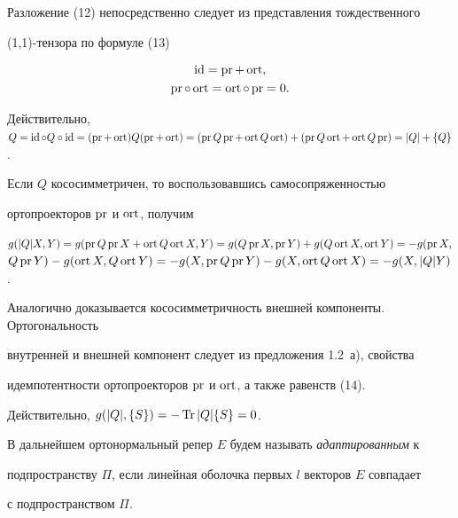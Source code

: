 \begin{pf}


Разложение (12) непосредственно следует из представления тождественного


(1,1)-тензора по формуле (13)


\begin{gather}


\id =\pr +\ort,\\


\pr \circ \ort =\ort \circ \pr =0.


\end{gather}


Действительно, $Q=\id \circ Q\circ \id =(\pr +\ort )Q(\pr +\ort )=


(\pr Q\pr +\ort Q\ort )+(\pr Q\ort +\ort Q\pr )=|Q|+\{ Q\}$.


Если $Q$ кососимметричен, то воспользовавшись самосопряженностью


ортопроекторов $\operatorname{pr} $ и $\operatorname{ort} $, получим


$g(|Q|X,Y)=g(\pr Q\pr X+\ort Q\ort X,Y)=g(Q\pr X,\pr Y)+g(Q\ort X,\ort Y)=


-g(\pr X,$ $Q\pr Y)-g(\ort X,Q\ort Y)=-g(X,\pr Q\pr Y)-g(X,\ort Q\ort X)=


-g(X,|Q|Y)$.


Аналогично доказывается кососимметричность внешней компоненты. Ортогональность


внутренней и внешней компонент следует из предложения 1.2~а), свойства


идемпотентности ортопроекторов $\operatorname{pr} $ и $\operatorname{ort} $, а также равенств (14).


Действительно, $g(|Q|,\{ S\} )=-\operatorname{Tr}|Q|\{ S\}=0$.


\end{pf}





В дальнейшем ортонормальный репер $E$ будем называть {\it адаптированным} к


подпространству $\Pi$, если линейная оболочка первых $l$ векторов $E$ совпадает


с подпространством $\Pi$.





